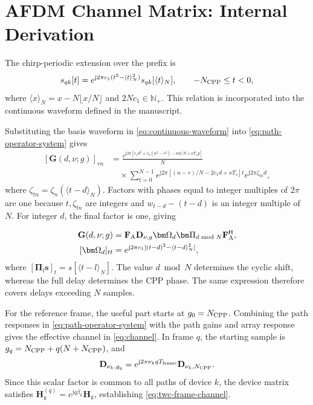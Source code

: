 \section{AFDM Channel Matrix: Internal Derivation}

The chirp-periodic extension over the prefix is
\begin{equation}
 s_{qk}[t]=e^{\mathrm j2\pi c_1(t^2-\langle t\rangle_N^2)}
 s_{qk}[\langle t\rangle_N],\qquad -N_{\rm CPP}\leq t<0,
 \label{eq:cpp}
\end{equation}
where $\langle x\rangle_N=x-N\lfloor x/N\rfloor$ and
$2Nc_1\in\mathbb N_+$. This relation is incorporated into the
continuous waveform defined in the manuscript.

Substituting the basis waveform in \eqref{eq:continuous-waveform}
into \eqref{eq:path-operator-system} gives
\begin{equation}
 \begin{split}
 [\mathbf G(d,\nu;g)]_{rn}
 &=\frac{e^{\mathrm j2\pi[c_1d^2+c_2(n^2-r^2)-nd/N+\nu T_sg]}}{N}\\
 &\quad\times\sum_{t=0}^{N-1}
 e^{\mathrm j2\pi[(n-r)/N-2c_1d+\nu T_s]t}
 e^{\mathrm j2\pi\zeta_{tn}d},
 \end{split}
 \label{eq:path-entry-expansion}
\end{equation}
where $\zeta_{tn}=\zeta_n(\langle t-d\rangle_N)$.
Factors with phases equal to integer multiples of $2\pi$ are one because $t,\zeta_{tn}$ are integers
and $w_{t-d}-(t-d)$ is an integer multiple of $N$.
For integer $d$, the final factor is one, giving

\begin{align}
 \mathbf G(d,\nu;g)
 &=\mathbf F_{\rm A}\mathbf D_{\nu,g}\bm\Omega_d
   \bm\Pi_{d\bmod N}\mathbf F_{\rm A}^{\mathsf H},
 \label{eq:integer-operator}\\
 [\bm\Omega_d]_{tt}
 &=e^{\mathrm j2\pi c_1[(t-d)^2-\langle t-d\rangle_N^2]},
 \label{eq:integer-prefix-phase}
\end{align}
where $[\bm\Pi_l\mathbf s]_t=s[\langle t-l\rangle_N]$.
The value $d\bmod N$ determines the cyclic shift, whereas the
full delay determines the CPP phase. The same expression therefore
covers delays exceeding $N$ samples.

For the reference frame, the useful part starts at
$g_0=N_{\rm CPP}$. Combining the path responses in
\eqref{eq:path-operator-system} with the path gains and array response
gives the effective channel in \eqref{eq:channel}.
In frame $q$, the starting sample is
$g_q=N_{\rm CPP}+q(N+N_{\rm CPP})$, and
\[
 \mathbf D_{\nu_k,g_q}
 =e^{\mathrm j2\pi\nu_kqT_{\rm frame}}\mathbf D_{\nu_k,N_{\rm CPP}}.
\]
Since this scalar factor is common to all paths of device $k$,
the device matrix satisfies
$\mathbf H_k^{(q)}=e^{\mathrm jq\beta_k}\mathbf H_k$, establishing
\eqref{eq:twc-frame-channel}.

